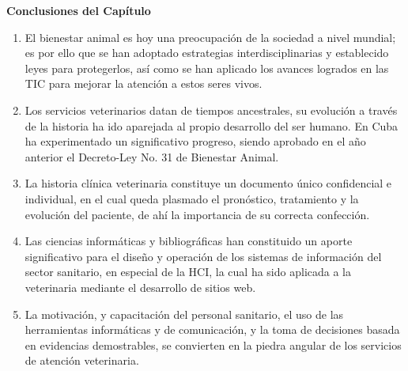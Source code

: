 \textbf{{\large Conclusiones del Capítulo }}

\begin{enumerate}
	\item El bienestar animal es hoy una preocupación de la sociedad a nivel mundial; es por ello que se han adoptado estrategias interdisciplinarias y establecido leyes para protegerlos, así como se han aplicado los avances logrados en las TIC para mejorar la atención a estos seres vivos.  
	
	\item  Los servicios veterinarios datan de tiempos ancestrales, su evolución a través de la historia ha ido aparejada al propio desarrollo del ser humano. En Cuba ha experimentado un significativo progreso, siendo aprobado en el año anterior el Decreto-Ley No. 31 de Bienestar Animal. 
	
	\item La historia clínica veterinaria constituye un documento único confidencial e individual, en el cual queda plasmado el pronóstico, tratamiento y la evolución del paciente, de ahí la importancia de su correcta confección. 
	
	\item Las ciencias informáticas y bibliográficas han constituido un aporte significativo para el diseño y operación de los sistemas de información del sector sanitario, en especial de la HCI, la cual ha sido aplicada a la veterinaria mediante el desarrollo de sitios web. 
	
	\item La motivación, y capacitación del personal sanitario, el uso de las herramientas informáticas y de comunicación, y la toma de decisiones basada en evidencias demostrables, se convierten en la piedra angular de los servicios de atención veterinaria. 
\end{enumerate}